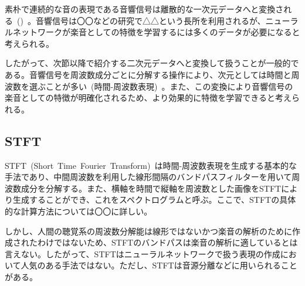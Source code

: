 素朴で連続的な音の表現である音響信号は離散的な一次元データへと変換される~()~。音響信号は〇〇などの研究で△△という長所を利用されるが、ニューラルネットワークが楽音としての特徴を学習するには多くのデータが必要になると考えられる。

したがって、次節以降で紹介する二次元データへと変換して扱うことが一般的である。音響信号を周波数成分ごとに分解する操作により、次元としては時間と周波数を選ぶことが多い~(時間-周波数表現)~。また、この変換により音響信号の楽音としての特徴が明確化されるため、より効果的に特徴を学習できると考えられる。

\subsection{STFT}

STFT~(Short~Time~Fourier~Transform)~は時間-周波数表現を生成する基本的な手法であり、中間周波数を利用した線形間隔のバンドパスフィルターを用いて周波数成分を分解する。また、横軸を時間で縦軸を周波数とした画像をSTFTにより生成することができ、これをスペクトログラムと呼ぶ。ここで、STFTの具体的な計算方法については〇〇に詳しい。%

しかし、人間の聴覚系の周波数分解能は線形ではないかつ楽音の解析のために作成されたわけではないため、STFTのバンドパスは楽音の解析に適しているとは言えない。したがって、STFTはニューラルネットワークで扱う表現の作成において人気のある手法ではない。ただし、STFTは音源分離などに用いられることがある。%


